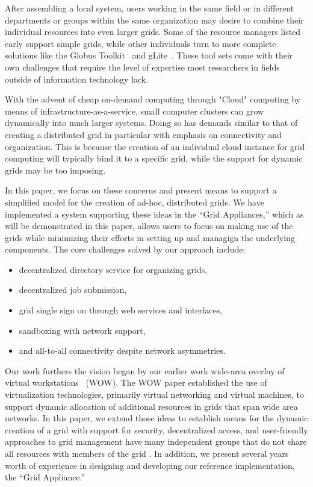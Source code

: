 \documentclass[conference]{IEEEtran}
\begin{document}
After assembling a local system, users working in the same field or in
different departments or groups within the same organization may desire to
combine their individual resources into even larger grids.  Some of the
resource managers listed early support simple grids, while other individuals
turn to more complete solutions like the Globus Toolkit~\cite{globus} and
gLite~\cite{glite}.  These tool sets come with their own challenges that
require the level of expertise most researchers in fields outside of
information technology lack.

With the advent of cheap on-demand computing through "Cloud" computing by means
of infrastructure-as-a-service, small computer clusters can grow dynamically
into much larger systems.  Doing so has demands similar to that of creating a
distributed grid in particular with emphasis on connectivity and organization.
This is because the creation of an individual cloud instance for grid computing
will typically bind it to a specific grid, while the support for dynamic grids
may be too imposing.

In this paper, we focus on these concerns and present means to support a
simplified model for the creation of ad-hoc, distributed grids.  We have
implemented a system supporting these ideas in the ``Grid Appliances,'' which
as will be demonstrated in this paper, allows users to focus on making use of
the grids while minimizing their efforts in setting up and managign the
underlying components.  The core challenges solved by our approach include:
\begin{itemize}
\item decentralized directory service for organizing grids,
\item decentralized job submission,
\item grid single sign on through web services and interfaces,
\item sandboxing with network support,
\item and all-to-all connectivity despite network asymmetries.
\end{itemize}

Our work furthers the vision began by our earlier work wide-area overlay of
virtual workstations~\cite{wow} (WOW).  The WOW paper established the use of
virtualization technologies, primarily virtual networking and virtual machines,
to support dynamic allocation of additional resources in grids that span wide
area networks.  In this paper, we extend those ideas to establish means for the
dynamic creation of a grid with support for security, decentralized access, and
user-friendly approaches to grid management have many independent groups that
do not share all resources with members of the grid .  In addition, we present
several years worth of experience in designing and developing our reference
implementation, the ``Grid Appliance.''
\end{document}
